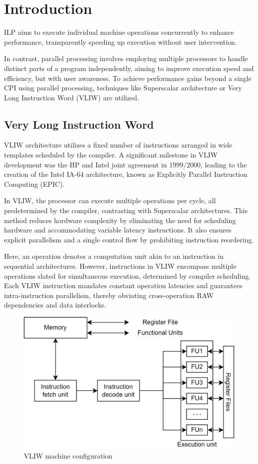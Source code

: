 \section{Introduction}

ILP aims to execute individual machine operations concurrently to enhance performance, transparently speeding up execution without user intervention.

In contrast, parallel processing involves employing multiple processors to handle distinct parts of a program independently, aiming to improve execution speed and efficiency, but with user awareness.
To achieve performance gains beyond a single CPI using parallel processing, techniques like Superscalar architecture or Very Long Instruction Word (VLIW) are utilized.

\subsection{Very Long Instruction Word}
VLIW architecture utilizes a fixed number of instructions arranged in wide templates scheduled by the compiler. 
A significant milestone in VLIW development was the HP and Intel joint agreement in 1999/2000, leading to the creation of the Intel IA-64 architecture, known as Explicitly Parallel Instruction Computing (EPIC).

In VLIW, the processor can execute multiple operations per cycle, all predetermined by the compiler, contrasting with Superscalar architectures. 
This method reduces hardware complexity by eliminating the need for scheduling hardware and accommodating variable latency instructions. 
It also ensures explicit parallelism and a single control flow by prohibiting instruction reordering.

Here, an operation denotes a computation unit akin to an instruction in sequential architectures. 
However, instructions in VLIW encompass multiple operations slated for simultaneous execution, determined by compiler scheduling. 
Each VLIW instruction mandates constant operation latencies and guarantees intra-instruction parallelism, thereby obviating cross-operation RAW dependencies and data interlocks.
\begin{figure}[H]
    \centering
    \includegraphics[width=0.75\linewidth]{images/vliw.png}
    \caption{VLIW machine configuration}
\end{figure}